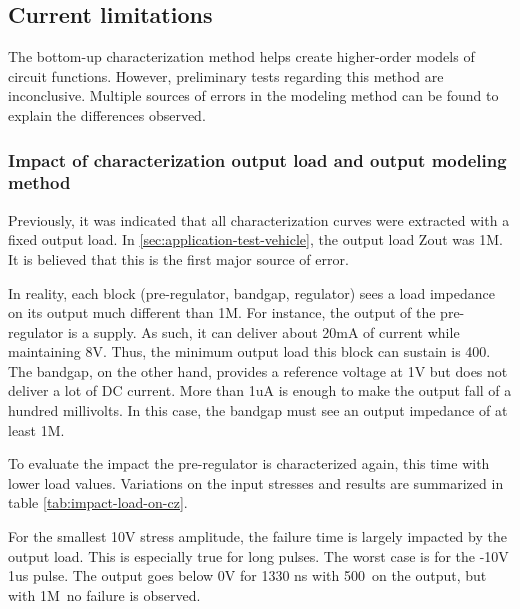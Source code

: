 \subsection{Current limitations}
\label{sec:current-limitations}
The bottom-up characterization method helps create higher-order models of circuit functions.
However, preliminary tests regarding this method are inconclusive.
Multiple sources of errors in the modeling method can be found to explain the differences observed.

\subsubsection{Impact of characterization output load and output modeling method}

Previously, it was indicated that all characterization curves were extracted with a fixed output load.
In \ref{sec:application-test-vehicle}, the output load Zout was 1M\textOmega.
It is believed that this is the first major source of error.

In reality, each block (pre-regulator, bandgap, regulator) sees a load impedance on its output much different than 1M\textOmega.
For instance, the output of the pre-regulator is a supply.
As such, it can deliver about 20mA of current while maintaining 8V.
Thus, the minimum output load this block can sustain is 400\textOmega.
The bandgap, on the other hand, provides a reference voltage at 1V but does not deliver a lot of DC current.
More than 1uA is enough to make the output fall of a hundred millivolts.
In this case, the bandgap must see an output impedance of at least 1M\textOmega.

To evaluate the impact the pre-regulator is characterized again, this time with lower load values.
Variations on the input stresses and results are summarized in table \ref{tab:impact-load-on-cz}.

For the smallest 10V stress amplitude, the failure time is largely impacted by the output load.
This is especially true for long pulses.
The worst case is for the -10V 1us pulse.
The output goes below 0V for 1330 ns with 500\textOmega\ on the output, but with 1M\textOmega\, no failure is observed.

